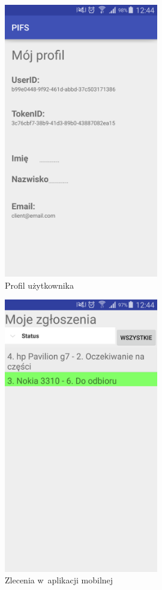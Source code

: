 \documentclass[a4paper,11pt]{article}
\begin{document}
\begin{figure}[H]
	\centering
	\includegraphics[width=0.6\textwidth,height=0.9\textheight]{profilPolski.png}
	\caption{Profil użytkownika}
\end{figure}


\begin{figure}[H]
	\centering
	\includegraphics[width=0.6\textwidth,height=0.9\textheight]{zleceniaMobile.png}
	\caption{Zlecenia w~aplikacji mobilnej}
\end{figure}
\end{document}

